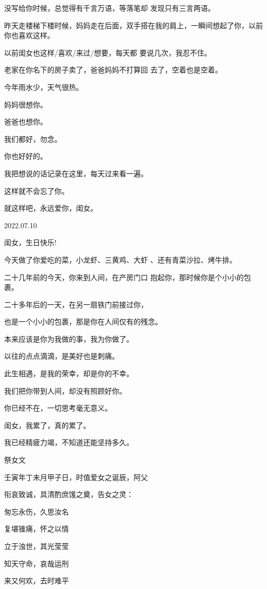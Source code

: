 \documentclass{article}
\begin{document}
没写给你时候，总觉得有千言万语，等落笔却
发现只有三言两语。 

昨天走楼梯下楼时候，妈妈走在后面，双手搭在我的肩上，一瞬间想起了你，以前你也喜欢这样。

以前闺女也这样/喜欢/来过/想要，每天都
要说几次，我忍不住。 

老家在你名下的房子卖了，爸爸妈妈不打算回
去了，空着也是空着。 


今年雨水少，天气很热。 


妈妈很想你。 


爸爸也想你。 


\newpage

我们都好，勿念。 


你也好好的。 

我把想说的话记录在这里，每天过来看一遍。


这样就不会忘了你。 


就这样吧，永远爱你，闺女。 



2022.07.10 


闺女，生日快乐! 

今天做了你爱吃的菜，小龙虾、三黄鸡、大虾
、还有青菜沙拉、烤牛排。 

二十几年前的今天，你来到人间，在产房门口
抱起你，那时候你是个小小的包裹。 

二十多年后的一天，在另一扇铁门前接过你，
\newpage

也是一个小小的包裹，那是你在人间仅有的残念。 


本来应该是你为我做的事，我为你做了。 


以往的点点滴滴，是美好也是刺痛。 


此生相遇，是我的荣幸，却是你的不幸。 


我们把你带到人间，却没有照顾好你。 


你已经不在，一切思考毫无意义。 


闺女，我累了，真的累了。 


我已经精疲力竭，不知道还能坚持多久。 



祭女文 

壬寅年丁未月甲子日，时值爱女之诞辰，阿父

\newpage
衔哀致诚，具清酌庶馐之奠，告女之灵： 


匆忘永伤，久思汝名 


复堪锥痛，怀之以情 


立于浊世，其光莹莹 


知天守命，哀哉运刑 


来又何欢，去时难平 
\end{document}

